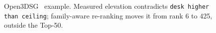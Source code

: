 \begin{figure}[t]
    \centering
    \caption{Open3DSG~\cite{koch2024open3dsg} example. Measured elevation
    contradicts \texttt{desk higher than ceiling}; family-aware re-ranking moves
    it from rank 6 to 425, outside the Top-50.}
    \label{fig:teaser}
\end{figure}
